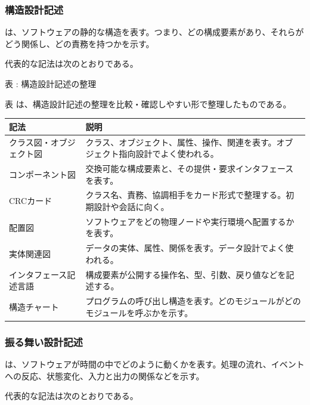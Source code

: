 \subsubsection{構造設計記述}

 は、ソフトウェアの静的な構造を表す。つまり、どの構成要素があり、それらがどう関係し、どの責務を持つかを示す。

代表的な記法は次のとおりである。

\par\smallskip\noindent{}\label{tab:ch03-04}表 \thetable: 構造設計記述の整理\par\smallskip
表 \thetable は、構造設計記述の整理を比較・確認しやすい形で整理したものである。\par\smallskip
\begin{longtable}{L{42mm}L{112mm}}
\toprule
記法 & 説明 \\
\midrule
\endhead
クラス図・オブジェクト図 & クラス、オブジェクト、属性、操作、関連を表す。オブジェクト指向設計でよく使われる。 \\
コンポーネント図 & 交換可能な構成要素と、その提供・要求インタフェースを表す。 \\
CRCカード & クラス名、責務、協調相手をカード形式で整理する。初期設計や会話に向く。 \\
配置図 & ソフトウェアをどの物理ノードや実行環境へ配置するかを表す。 \\
実体関連図 & データの実体、属性、関係を表す。データ設計でよく使われる。 \\
インタフェース記述言語 & 構成要素が公開する操作名、型、引数、戻り値などを記述する。 \\
構造チャート & プログラムの呼び出し構造を表す。どのモジュールがどのモジュールを呼ぶかを示す。 \\
\bottomrule
\end{longtable}

\subsubsection{振る舞い設計記述}

 は、ソフトウェアが時間の中でどのように動くかを表す。処理の流れ、イベントへの反応、状態変化、入力と出力の関係などを示す。

代表的な記法は次のとおりである。

